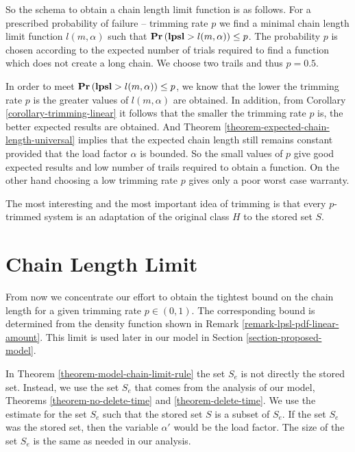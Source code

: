 So the schema to obtain a chain length limit function is as follows. For a prescribed probability of failure -- trimming rate $p$ we find a minimal chain length limit function $l(m, \alpha)$ such that $\mathbf{Pr}\left(\mathbf{lpsl} > l(m, \alpha)\right) \leq p$. The probability $p$ is chosen according to the expected number of trials required to find a function which does not create a long chain. We choose two trails and thus $p = 0.5$.

In order to meet $\mathbf{Pr}\left(\mathbf{lpsl} > l(m, \alpha)\right) \leq p$, we know that the lower the trimming rate $p$ is the greater values of $l(m, \alpha)$ are obtained. In addition, from Corollary \ref{corollary-trimming-linear} it follows that the smaller the trimming rate $p$ is, the better expected results are obtained. And Theorem \ref{theorem-expected-chain-length-universal} implies that the expected chain length still remains constant provided that the load factor $\alpha$ is bounded. So the small values of $p$ give good expected results and low number of trails required to obtain a function. On the other hand choosing a low trimming rate $p$ gives only a poor worst case warranty.

The most interesting and the most important idea of trimming is that every $p$-trimmed system is an adaptation of the original class $H$ to the stored set $S$.

\section{Chain Length Limit}
\label{section-linear-systems-linear-amount-constant-estimate}
From now we concentrate our effort to obtain the tightest bound on the chain length for a given trimming rate $p \in (0, 1)$. The corresponding bound is determined from the density function shown in Remark \ref{remark-lpsl-pdf-linear-amount}. This limit is used later in our model in Section \ref{section-proposed-model}.

In Theorem \ref{theorem-model-chain-limit-rule} the set $S_e$ is not directly the stored set. Instead, we use the set $S_e$ that comes from the analysis of our model, Theorems \ref{theorem-no-delete-time} and \ref{theorem-delete-time}. We use the estimate for the set $S_e$ such that the stored set $S$ is a subset of $S_e$. If the set $S_e$ was the stored set, then the variable $\alpha'$ would be the load factor. The size of the set $S_e$ is the same as needed in our analysis.

